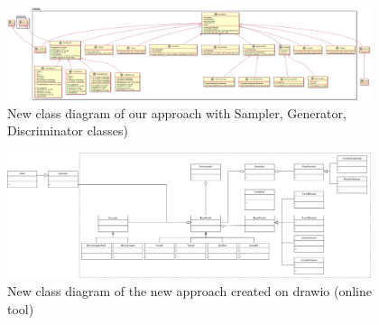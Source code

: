\begin{figure}
  \centering
    \includegraphics[width=0.95\textwidth]{appendices/NewClassDiagram.png}
  \caption{New class diagram of our approach with Sampler, Generator, Discriminator classes)}
  \label{fig:overview}
\end{figure}

\begin{figure}
  \centering
    \includegraphics[width=0.95\textwidth]{appendices/NewClassDiagram.drawio.png}
  \caption{New class diagram of the new approach created on drawio (online tool)}
  \label{fig:overview}
\end{figure}




